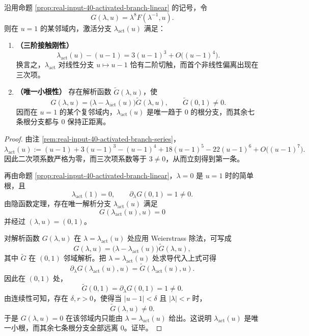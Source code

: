 \begin{theorem}[激活分支的三阶接触刚性与唯一小根性]\label{thm:xi-output-potential-activated-branch-rigidity}
沿用命题 \ref{prop:real-input-40-activated-branch-linear} 的记号，令
\[
G(\lambda,u)=\lambda^8F(\lambda^{-1},u).
\]
则在 \(u=1\) 的某邻域内，激活分支 \(\lambda_{\mathrm{act}}(u)\) 满足：
\begin{enumerate}
  \item \textbf{（三阶接触刚性）}
  \[
  \boxed{\;
  \lambda_{\mathrm{act}}(u)-(u-1)=3(u-1)^3+O\!\bigl((u-1)^4\bigr).
  \;}
  \]
  换言之，\(\lambda_{\mathrm{act}}\) 对线性分支 \(u\mapsto u-1\) 恰有二阶切触，而首个非线性偏离出现在三次项。
  \item \textbf{（唯一小根性）} 存在解析函数 \(\widetilde G(\lambda,u)\)，使
  \[
  G(\lambda,u)=\bigl(\lambda-\lambda_{\mathrm{act}}(u)\bigr)\widetilde G(\lambda,u),
  \qquad
  \widetilde G(0,1)\neq 0.
  \]
  因而在 \(u=1\) 的某个复邻域内，\(\lambda_{\mathrm{act}}(u)\) 是唯一趋于 \(0\) 的根分支，而其余七条根分支都与 \(0\) 保持正距离。
\end{enumerate}
\end{theorem}
\begin{proof}
由注 \ref{rem:real-input-40-activated-branch-series}，
\[
\lambda_{\mathrm{act}}(u)
:=(u-1)+3(u-1)^3-(u-1)^4+18(u-1)^5-22(u-1)^6
+O\!\bigl((u-1)^7\bigr).
\]
因此二次项系数严格为零，而三次项系数等于 \(3\neq 0\)，从而立刻得到第一条。

再由命题 \ref{prop:real-input-40-activated-branch-linear}，\(\lambda=0\) 是 \(u=1\) 时的简单根，且
\[
\lambda_{\mathrm{act}}(1)=0,
\qquad
\partial_\lambda G(0,1)=1\neq 0.
\]
由隐函数定理，存在唯一解析分支 \(\lambda_{\mathrm{act}}(u)\) 满足
\[
G(\lambda_{\mathrm{act}}(u),u)=0
\]
并经过 \((\lambda,u)=(0,1)\)。

对解析函数 \(G(\lambda,u)\) 在 \(\lambda=\lambda_{\mathrm{act}}(u)\) 处应用 Weierstrass 除法，可写成
\[
G(\lambda,u)=\bigl(\lambda-\lambda_{\mathrm{act}}(u)\bigr)\widetilde G(\lambda,u),
\]
其中 \(\widetilde G\) 在 \((0,1)\) 邻域解析。把 \(\lambda=\lambda_{\mathrm{act}}(u)\) 处求导代入上式可得
\[
\partial_\lambda G(\lambda_{\mathrm{act}}(u),u)=\widetilde G(\lambda_{\mathrm{act}}(u),u).
\]
因此在 \((0,1)\) 处，
\[
\widetilde G(0,1)=\partial_\lambda G(0,1)=1\neq 0.
\]
由连续性可知，存在 \(\delta,r>0\)，使得当 \(|u-1|<\delta\) 且 \(|\lambda|<r\) 时，
\[
\widetilde G(\lambda,u)\neq 0.
\]
于是 \(G(\lambda,u)=0\) 在该邻域内只能由
\(
\lambda=\lambda_{\mathrm{act}}(u)
\)
给出。这说明 \(\lambda_{\mathrm{act}}(u)\) 是唯一小根，而其余七条根分支全部远离 \(0\)。证毕。
\end{proof}

